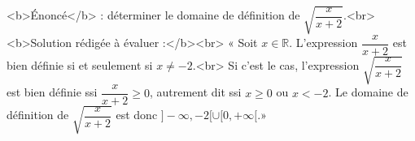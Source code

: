 <b>Énoncé</b> : déterminer le domaine de définition de $\sqrt{\dfrac{x}{x+2}}$.<br> <b>Solution rédigée à évaluer :</b><br>  « Soit $x\in\mathbb{R}$. L'expression $\dfrac{x}{x+2}$ est bien définie si et seulement si $x\neq -2$.<br> Si c'est le cas, l'expression $\sqrt{\dfrac{x}{x+2}}$ est bien définie ssi $\dfrac{x}{x+2}\geq 0$, autrement dit ssi $x\geq 0$ ou $x<-2$. Le domaine de définition de $\sqrt{\dfrac{x}{x+2}}$ est donc $]-\infty,-2[\cup [0,+\infty[$.»

\begin{reponses}
\end{reponses}

